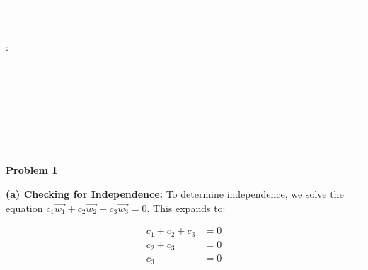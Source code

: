 \documentclass[letterpaper,11pt]{article}
\newcommand{\problem}[1]{
    \vspace{10pt}\textbf{\Large Problem #1}\\\vspace{-5pt}
}
\begin{document}
\BgThispage

\thispagestyle{empty}

\begin{center}
    \textsc{\school} \\
    \textsc{\department} \\\vspace{-5pt}
\end{center}
\rule{\textwidth}{1pt} \\\vspace{-15pt}

\begin{center}
    \coursecode: \coursename \\\vspace{10pt}
    \textbf{\LARGE \assignment} \\\vspace{-5pt}
\end{center}
\rule{\textwidth}{2pt} \\\vspace{-5pt}

\begin{center}
    \large \name \\\vspace{3pt}
    \email \\\vspace{3pt}
    \submissiondate \\\vspace{20pt}
\end{center}

\setlength{\abovedisplayskip}{0pt}
\setlength{\belowdisplayskip}{0pt}


\problem{1}

\textbf{(a) Checking for Independence:}  
To determine independence, we solve the equation $c_1 \vec{w_1} + c_2 \vec{w_2} + c_3 \vec{w_3} = 0$. This expands to:

\begin{align*}
    c_1 + c_2 + c_3 &= 0 \\
    c_2 + c_3 &= 0 \\
    c_3 &= 0 \\
\end{align*}
\end{document}
